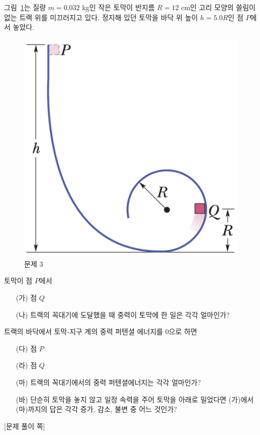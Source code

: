 \documentclass[floatfix,nofootinbib,superscriptaddress,fleqn,preprint]{revtex4}
\begin{document}
그림~\ref{fig:3}는 질량 $m=0.032$ kg인 작은 토막이 반지름 $R=12$ cm인
고리 모양의 쓸림이 없는 트랙 위를 미끄러지고 있다. 정지해 있던 토막을
바닥 위 높이 $h=5.0 R$인 점 $P$에서 놓았다. 
\begin{figure}[ht]
  \centering
\includegraphics[scale=0.3]{Qfig8-3-20220328.png}
  \caption{문제 3}
  \label{fig:3}
\end{figure}
토막이 점 $P$에서
\begin{itemize}
\item[(가)] 점 $Q$
\item[(나)] 트랙의 꼭대기에 도달했을 때 중력이 토막에 한 일은 각각
  얼마인가?
\end{itemize}
트랙의 바닥에서 토막-지구 계의 중력 퍼텐셜 에너지를 $0$으로 하면 
\begin{itemize}
\item[(다)] 점 $P$
\item[(라)] 점 $Q$
\item[(마)] 트랙의 꼭대기에서의 중력 퍼텐셜에너지는 각각 얼마인가?
\item[(바)] 단순히 토막을 놓지 않고 일정 속력을 주어 토막을 아래로
  밀었다면 (가)에서 (마)까지의 답은 각각 증가, 감소, 불변 중 어느
  것인가? 
\end{itemize}
\newpage

{\color{gray} [문제 풀이 쪽]}

\newpage
\end{document}
